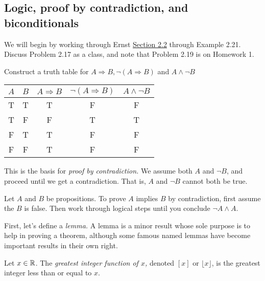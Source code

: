 \documentclass{ximera}
\begin{document}
\subsection{Logic, proof by contradiction, and biconditionals}%

We will begin by working through Ernst \href{https://danaernst.com/IBL-IntroToProof/pretext/sec_Intro_to_Logic.html}{Section 2.2} through Example 2.21. Discuss Problem 2.17 as a class, and note that Problem 2.19 is on Homework 1.



\begin{br}
 Construct a truth table for $A\Rightarrow B, \neg (A\Rightarrow B)$ and $A\land \neg B$
\end{br}
\begin{solution}
 
\begin{tabular}{c|c|c|c|c}
 $A$ 	& $B$	& $A\Rightarrow B$ 	& $\neg (A\Rightarrow B)$ & $A\land \neg B$\\\hline
  T 	& T		& T 				& F					& F	\\
  T 	& F 		& F 				& T					& T\\
  F 	& T 		& T 				& F					& F\\
  F 	& F 		& T 				& F					& F\\
\end{tabular}
\end{solution}

This is the basis for \emph{proof by contradiction.} We assume both $A$ and $\neg B$, and proceed until we get a contradiction. That is, $A$ and $\neg B$ cannot both be true.

\begin{defn}\label{proof-contradiction}
 Let $A$ and $B$ be propositions. To prove $A$ implies $B$ by contradiction, first assume the $B$ is false. Then work through logical steps until you conclude $\neg A \land A$.
\end{defn}

First, let's define a \emph{lemma.} A lemma is a minor result whose sole purpose is to help in proving a theorem, although some famous named lemmas have become important results in their own right.

\begin{defn}\label{defn:floor}
 Let $x\in\mathbb R$. The \emph{greatest integer function of $x$,} denoted $[x]$ or $\lfloor x \rfloor$, is the greatest integer less than or equal to $x$.
\end{defn}
\end{document}
